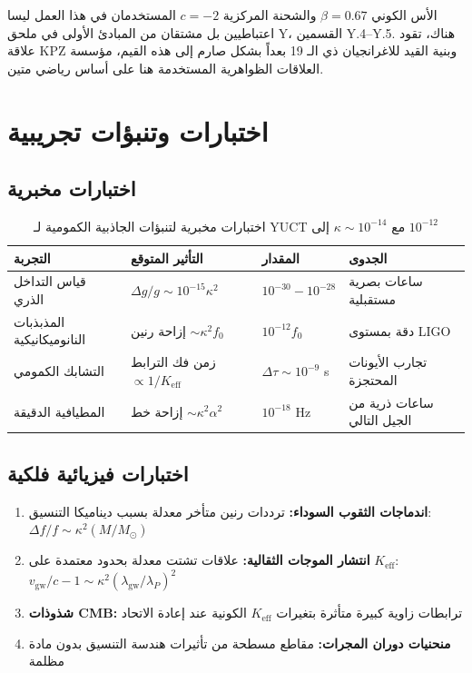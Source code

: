 \documentclass[11pt,a4paper]{article}
\theoremstyle{remark}
\newcommand{\Keff}{K_{\mathrm{eff}}}
\begin{document}
	الأس الكوني $\beta = 0.67$ والشحنة المركزية $c = -2$ المستخدمان في هذا العمل ليسا اعتباطيين بل مشتقان من المبادئ الأولى في ملحق Y، القسمين Y.4–Y.5. هناك، تقود علاقة KPZ وبنية القيد للاغرانجيان ذي الـ 19 بعداً بشكل صارم إلى هذه القيم، مؤسسة العلاقات الظواهرية المستخدمة هنا على أساس رياضي متين.
	
	\section{اختبارات وتنبؤات تجريبية}
	\label{sec:experimental-tests}
	
	\subsection{اختبارات مخبرية}
	
	\begin{table}[htbp]
		\centering
		\begin{tabular}{p{2.8cm}p{4.2cm}p{2.5cm}p{2.5cm}}
			\toprule
			\textbf{التجربة} & \textbf{التأثير المتوقع} & \textbf{المقدار} & \textbf{الجدوى} \\
			\midrule
			قياس التداخل الذري & $\Delta g/g \sim 10^{-15}\kappa^2$ & $10^{-30} - 10^{-28}$ & ساعات بصرية مستقبلية \\
			المذبذبات النانوميكانيكية & إزاحة رنين $\sim \kappa^2 f_0$ & $10^{-12} f_0$ & دقة بمستوى LIGO \\
			التشابك الكمومي & زمن فك الترابط $\propto 1/\Keff$ & $\Delta\tau \sim 10^{-9}$ s & تجارب الأيونات المحتجزة \\
			المطيافية الدقيقة & إزاحة خط $\sim \kappa^2 \alpha^2$ & $10^{-18}$ Hz & ساعات ذرية من الجيل التالي \\
			\bottomrule
		\end{tabular}
		\caption{اختبارات مخبرية لتنبؤات الجاذبية الكمومية لـ YUCT مع $\kappa \sim 10^{-14}$ إلى $10^{-12}$}
		\label{tab:lab-tests}
	\end{table}
	
	\subsection{اختبارات فيزيائية فلكية}
	
	\begin{enumerate}
		\item \textbf{اندماجات الثقوب السوداء:} ترددات رنين متأخر معدلة بسبب ديناميكا التنسيق: $\Delta f/f \sim \kappa^2 (M/M_\odot)$
		
		\item \textbf{انتشار الموجات الثقالية:} علاقات تشتت معدلة بحدود معتمدة على $\Keff$: $v_{\text{gw}}/c - 1 \sim \kappa^2 (\lambda_{\text{gw}}/\lambda_P)^2$
		
		\item \textbf{شذوذات CMB:} ترابطات زاوية كبيرة متأثرة بتغيرات $\Keff$ الكونية عند إعادة الاتحاد
		
		\item \textbf{منحنيات دوران المجرات:} مقاطع مسطحة من تأثيرات هندسة التنسيق بدون مادة مظلمة
	\end{enumerate}
	
\end{document}
